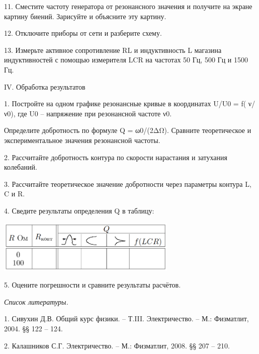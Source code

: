 11. Сместите частоту генератора от резонансного значения и получите на
экране картину биений. Зарисуйте и объясните эту картину.

12. Отключите приборы от сети и разберите схему.

13. Измерьте активное сопротивление RL и индуктивность L магазина
индуктивностей с помощью измерителя LCR на частотах 50 Гц, 500 Гц и 1500
Гц.

IV. Обработка результатов

1. Постройте на одном графике резонансные кривые в координатах U/U0 = f(
ν/ν0), где U0 -- напряжение при резонансной частоте ν0.

Определите добротность по формуле Q = ω0/(2ΔΩ). Сравните теоретическое и
экспериментальное значения резонансной частоты.

2. Рассчитайте добротность контура по скорости нарастания и затухания
колебаний.

3. Рассчитайте теоретическое значение добротности через параметры
контура L, C и R.

4. Сведите результаты определения Q в таблицу:

\includegraphics[width=3.37592in,height=0.99167in]{./media/image4.png}

5. Оцените погрешности и сравните результаты расчётов.

\emph{Список литературы.}

1. Сивухин Д.В. Общий курс физики. -- Т.III. Электричество. -- М.:
Физматлит, 2004. §§ 122 -- 124.

2. Калашников С.Г. Электричество. -- М.: Физматлит, 2008. §§ 207 -- 210.
